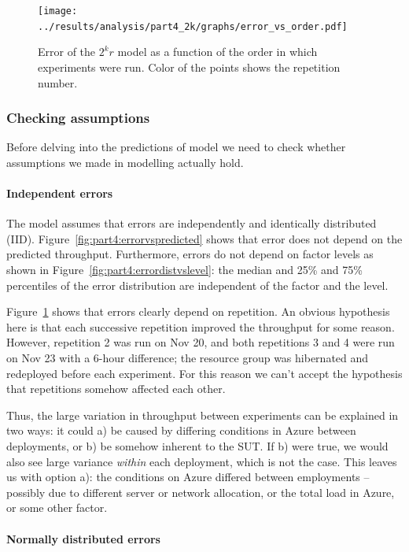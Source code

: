 \documentclass[11pt]{article}
\begin{document}
\begin{figure}[h]
\centering
\texttt{[image: ../results/analysis/part4\_2k/graphs/error\_vs\_order.pdf]}
\caption{Error of the $2^kr$ model as a function of the order in which experiments were run. Color of the points shows the repetition number.}
\label{fig:part4:errorvsorder}
\end{figure}


\subsubsection{Checking assumptions}

Before delving into the predictions of model we need to check whether assumptions we made in modelling actually hold.

\paragraph{Independent errors}

The model assumes that errors are independently and identically distributed (IID). Figure~\ref{fig:part4:errorvspredicted} shows that error does not depend on the predicted throughput. Furthermore, errors do not depend on factor levels as shown in Figure~\ref{fig:part4:errordistvslevel}: the median and 25\% and 75\% percentiles of the error distribution are independent of the factor and the level.

Figure~\ref{fig:part4:errorvsorder} shows that errors clearly depend on repetition. An obvious hypothesis here is that each successive repetition improved the throughput for some reason. However, repetition 2 was run on Nov 20, and both repetitions 3 and 4 were run on Nov 23 with a 6-hour difference; the resource group was hibernated and redeployed before each experiment. For this reason we can't accept the hypothesis that repetitions somehow affected each other.

Thus, the large variation in throughput between experiments can be explained in two ways: it could a) be caused by differing conditions in Azure between deployments, or b) be somehow inherent to the SUT. If b) were true, we would also see large variance \emph{within} each deployment, which is not the case. This leaves us with option a): the conditions on Azure differed between employments -- possibly due to different server or network allocation, or the total load in Azure, or some other factor.

\paragraph{Normally distributed errors}
\end{document}
